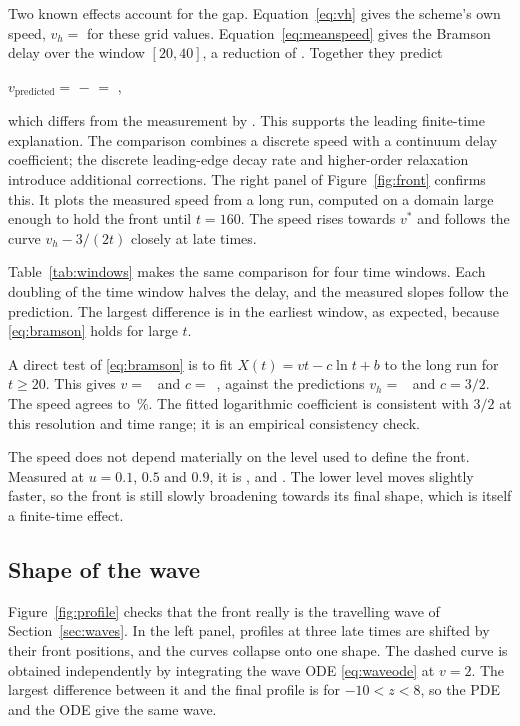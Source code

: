 \documentclass[11pt,a4paper]{article}
\begin{document}
Two known effects account for the gap. Equation~\eqref{eq:vh} gives the scheme's own speed, $v_h=$
\resGridSpeed{} for these grid values. Equation~\eqref{eq:meanspeed} gives the Bramson delay
over the window $[20,40]$, a reduction of \resBaseDelay{}. Together they predict
\begin{center}
  $v_{\mathrm{predicted}}=$ \resGridSpeed{} $-$ \resBaseDelay{} $=$ \resBasePredicted{},
\end{center}
which differs from the measurement by \resBaseGap{}. This supports the leading finite-time
explanation. The comparison combines a discrete speed with a continuum delay coefficient;
the discrete leading-edge decay rate and higher-order relaxation introduce additional corrections. The right panel of Figure~\ref{fig:front}
confirms this. It plots the measured speed from a long run, computed on a domain large enough to
hold the front until $t=160$. The speed rises towards $v^*$ and follows the curve $v_h-3/(2t)$ closely
at late times.

Table~\ref{tab:windows} makes the same comparison for four time windows. Each doubling of the
time window halves the delay, and the measured slopes follow the prediction. The largest
difference is in the earliest window, as expected, because \eqref{eq:bramson} holds for large $t$.

\begin{table}[H]
\centering\small
\caption{Measured front speed in four time windows, compared with the corrected prediction.}
\label{tab:windows}

\end{table}

A direct test of \eqref{eq:bramson} is to fit $X(t)=vt-c\ln t+b$ to the long run for $t\ge20$. This gives
$v=$~\resLongSpeed{} and $c=$~\resLongDelay{}, against the predictions $v_h=$~\resLongGrid{} and $c=3/2$. The
speed agrees to \resLongGap{}\,\%. The fitted logarithmic coefficient is consistent
with $3/2$ at this resolution and time range; it is an empirical consistency check.

The speed does not depend materially on the level used to define the front. Measured at
$u=0.1$, $0.5$ and $0.9$, it is \resSpeedTen{}, \resSpeedFifty{} and \resSpeedNinety{}. The lower level moves slightly
faster, so the front is still slowly broadening towards its final shape, which is itself a
finite-time effect.

\subsection{Shape of the wave}
Figure~\ref{fig:profile} checks that the front really is the travelling wave of
Section~\ref{sec:waves}. In the left panel, profiles at three late times are shifted by their front
positions, and the curves collapse onto one shape. The dashed curve is obtained independently
by integrating the wave ODE \eqref{eq:waveode} at $v=2$. The largest difference between it and
the final profile is \resProfileGap{} for $-10<z<8$, so the PDE and the ODE give the same wave.
\end{document}
